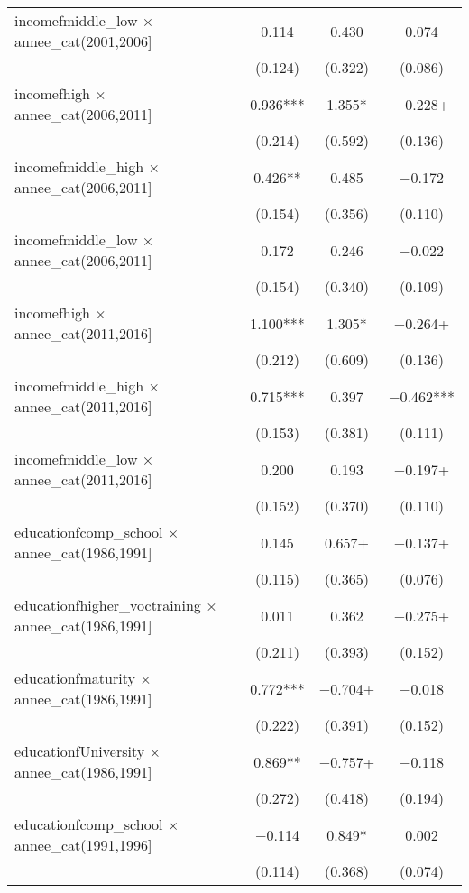 \begin{table}
\begin{tabular}[t]{lccc}
incomefmiddle\_low × annee\_cat(2001,2006] & \num{0.114} & \num{0.430} & \num{0.074}\\
 & (\num{0.124}) & (\num{0.322}) & (\num{0.086})\\
incomefhigh × annee\_cat(2006,2011] & \num{0.936}*** & \num{1.355}* & \num{-0.228}+\\
 & (\num{0.214}) & (\num{0.592}) & (\num{0.136})\\
incomefmiddle\_high × annee\_cat(2006,2011] & \num{0.426}** & \num{0.485} & \num{-0.172}\\
 & (\num{0.154}) & (\num{0.356}) & (\num{0.110})\\
incomefmiddle\_low × annee\_cat(2006,2011] & \num{0.172} & \num{0.246} & \num{-0.022}\\
 & (\num{0.154}) & (\num{0.340}) & (\num{0.109})\\
incomefhigh × annee\_cat(2011,2016] & \num{1.100}*** & \num{1.305}* & \num{-0.264}+\\
 & (\num{0.212}) & (\num{0.609}) & (\num{0.136})\\
incomefmiddle\_high × annee\_cat(2011,2016] & \num{0.715}*** & \num{0.397} & \num{-0.462}***\\
 & (\num{0.153}) & (\num{0.381}) & (\num{0.111})\\
incomefmiddle\_low × annee\_cat(2011,2016] & \num{0.200} & \num{0.193} & \num{-0.197}+\\
 & (\num{0.152}) & (\num{0.370}) & (\num{0.110})\\
educationfcomp\_school × annee\_cat(1986,1991] & \num{0.145} & \num{0.657}+ & \num{-0.137}+\\
 & (\num{0.115}) & (\num{0.365}) & (\num{0.076})\\
educationfhigher\_voctraining × annee\_cat(1986,1991] & \num{0.011} & \num{0.362} & \num{-0.275}+\\
 & (\num{0.211}) & (\num{0.393}) & (\num{0.152})\\
educationfmaturity × annee\_cat(1986,1991] & \num{0.772}*** & \num{-0.704}+ & \num{-0.018}\\
 & (\num{0.222}) & (\num{0.391}) & (\num{0.152})\\
educationfUniversity × annee\_cat(1986,1991] & \num{0.869}** & \num{-0.757}+ & \num{-0.118}\\
 & (\num{0.272}) & (\num{0.418}) & (\num{0.194})\\
educationfcomp\_school × annee\_cat(1991,1996] & \num{-0.114} & \num{0.849}* & \num{0.002}\\
 & (\num{0.114}) & (\num{0.368}) & (\num{0.074})\\

\end{tabular}
\end{table}

